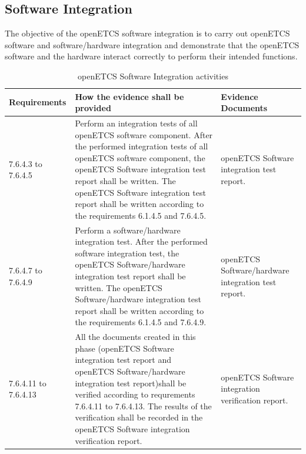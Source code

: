 \documentclass{template/openetcs_report}
\begin{document}
\subsection{Software Integration}
\begin{flushleft}
The objective of the openETCS software integration is to carry out openETCS software and software/hardware integration and demonstrate that the openETCS software and the hardware interact correctly to perform their intended functions.
\end{flushleft}
{\footnotesize\sffamily\centering
\begin{longtable}{|p{2cm}|p{9cm}|p{3cm}|}
\caption{openETCS Software Integration activities}\\
\hline
\bfseries Requirements & \bfseries How the evidence shall be provided & \bfseries Evidence Documents\\
\hline
\hline
\endhead
\hline
\endfoot

7.6.4.3 to 7.6.4.5 & Perform an integration tests of all openETCS software component.
After the performed integration tests of all openETCS software component, the openETCS Software integration test report shall be written. 
The openETCS Software integration test report shall be written according to the requirements 6.1.4.5 and 7.6.4.5. & openETCS Software integration test report.\\ 
\hline
7.6.4.7 to 7.6.4.9 & Perform a software/hardware integration test.
After the performed software integration test, the openETCS Software/hardware integration test report shall be written. 
The openETCS Software/hardware integration test report shall be written according to the requirements 6.1.4.5 and 7.6.4.9. & openETCS Software/hardware integration test report.\\ 
\hline
7.6.4.11 to 7.6.4.13 & All the documents created in this phase (openETCS Software integration test report and  openETCS Software/hardware integration test report)shall be verified according to requrements 7.6.4.11 to 7.6.4.13.
The results of the verification shall be recorded in the openETCS Software integration verification report. & openETCS Software integration verification report.\\ 
\hline
\end{longtable}}
\end{document}
